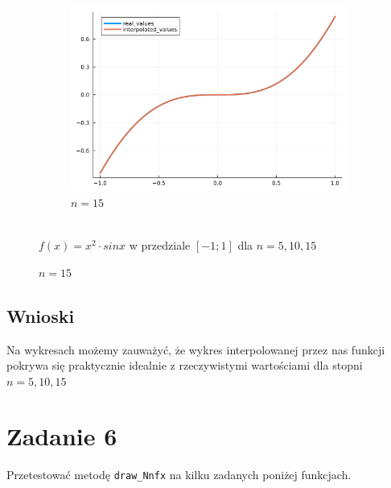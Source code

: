 \documentclass{article}
\def\v{0.47}
\begin{document}
\begin{figure}[H]
\begin{subfigure}[b]{\v\linewidth}
			\includegraphics[width=\linewidth]{graphs/zad5.b.15.png}
			\caption{$n = 15$}
		\end{subfigure}
	\\{$f(x) = x^2 \cdot sin x$ w przedziale $[-1;1]$ dla $n = 5,10,15$}
	\end{figure}
\subsection*{Wnioski}
	Na wykresach możemy zauważyć, że wykres interpolowanej przez nas funkcji pokrywa się praktycznie idealnie z rzeczywistymi wartościami dla stopni $n = 5, 10, 15$

\section*{Zadanie 6}
	Przetestować metodę \texttt{draw\_Nnfx} na kilku zadanych poniżej funkcjach.
\end{document}
